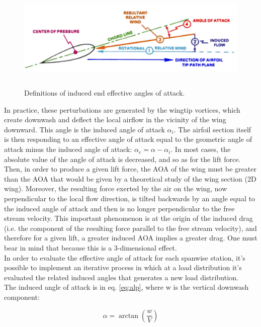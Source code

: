 \begin{figure}[H]
\centering
{\includegraphics[height=4.3cm]{Immagini/induced}} 
\caption{Definitions of induced end effective angles of attack.}
\end{figure}

In practice, these perturbations are generated by the wingtip vortices, which create downwash and deflect the local airflow in the vicinity of the wing downward. This angle is the induced angle of attack $\alpha_i$. The airfoil section itself is then responding to an effective angle of attack equal to the geometric angle of attack minus the induced angle of attack: $\alpha_e=\alpha-\alpha_i$. In most cases, the absolute value of the angle of attack is decreased, and so as for the lift force. Then, in order to produce a given lift force, the AOA of the wing must be greater than the AOA that would be given by a theoretical study of the wing section (2D wing). Moreover, the resulting force exerted by the air on the wing, now perpendicular to the local flow direction, is tilted backwards by an angle equal to the induced angle of attack and then is no longer perpendicular to the free stream velocity. This important phenomenon is at the origin of the induced drag (i.e. the component of the resulting force parallel to the free stream velocity), and therefore for a given lift, a greater induced AOA implies a greater drag. One must bear in mind that because this is a 3-dimensional effect.\cite{induced}\\

In order to evaluate the effective angle of attack  for each spanwise station, it's possible to implement an iterative process in which at a load distribution it's evaluated the related induced angles that generates a new load distribution.\\
The induced angle of attack is in eq. \ref{eq:alp},  where w is the vertical downwash component:

\begin{equation}
\alpha =\arctan\left( {\frac{w}{V}}\right )
\label{eq:alp}
\end{equation}

